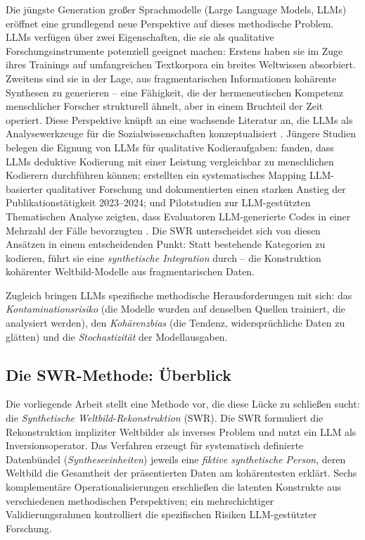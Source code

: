 \documentclass[11pt,a4paper]{article}
\theoremstyle{definition}
\theoremstyle{plain}
\theoremstyle{remark}
\begin{document}
Die j\"ungste Generation gro\ss{}er Sprachmodelle (Large Language Models, LLMs) er\"offnet eine grundlegend neue Perspektive auf dieses methodische Problem. LLMs verf\"ugen \"uber zwei Eigenschaften, die sie als qualitative Forschungsinstrumente potenziell geeignet machen: Erstens haben sie im Zuge ihres Trainings auf umfangreichen Textkorpora ein breites Weltwissen absorbiert. Zweitens sind sie in der Lage, aus fragmentarischen Informationen koh\"arente Synthesen zu generieren -- eine F\"ahigkeit, die der hermeneutischen Kompetenz menschlicher Forscher strukturell \"ahnelt, aber in einem Bruchteil der Zeit operiert. Diese Perspektive kn\"upft an eine wachsende Literatur an, die LLMs als Analysewerkzeuge f\"ur die Sozialwissenschaften konzeptualisiert \citep{Ziems2024, Bail2024, Argyle2023}. J\"ungere Studien belegen die Eignung von LLMs f\"ur qualitative Kodieraufgaben: \citet{Tai2024} fanden, dass LLMs deduktive Kodierung mit einer Leistung vergleichbar zu menschlichen Kodierern durchf\"uhren k\"onnen; \citet{Barros2024} erstellten ein systematisches Mapping LLM-basierter qualitativer Forschung und dokumentierten einen starken Anstieg der Publikationst\"atigkeit 2023--2024; und Pilotstudien zur LLM-gest\"utzten Thematischen Analyse zeigten, dass Evaluatoren LLM-generierte Codes in einer Mehrzahl der F\"alle bevorzugten \citep{Wang2025}. Die SWR unterscheidet sich von diesen Ans\"atzen in einem entscheidenden Punkt: Statt bestehende Kategorien zu kodieren, f\"uhrt sie eine \emph{synthetische Integration} durch -- die Konstruktion koh\"arenter Weltbild-Modelle aus fragmentarischen Daten.

Zugleich bringen LLMs spezifische methodische Herausforderungen mit sich: das \emph{Kontaminationsrisiko} (die Modelle wurden auf denselben Quellen trainiert, die analysiert werden), den \emph{Koh\"arenzbias} (die Tendenz, widerspr\"uchliche Daten zu gl\"atten) und die \emph{Stochastizit\"at} der Modellausgaben.

\subsection{Die SWR-Methode: \"Uberblick}
\label{sec:ueberblick}

Die vorliegende Arbeit stellt eine Methode vor, die diese L\"ucke zu schlie\ss{}en sucht: die \emph{Synthetische Weltbild-Rekonstruktion} (SWR). Die SWR formuliert die Rekonstruktion impliziter Weltbilder als inverses Problem und nutzt ein LLM als Inversionsoperator. Das Verfahren erzeugt f\"ur systematisch definierte Datenb\"undel (\emph{Syntheseeinheiten}) jeweils eine \emph{fiktive synthetische Person}, deren Weltbild die Gesamtheit der pr\"asentierten Daten am koh\"arentesten erkl\"art. Sechs komplement\"are Operationalisierungen erschlie\ss{}en die latenten Konstrukte aus verschiedenen methodischen Perspektiven; ein mehrschichtiger Validierungsrahmen kontrolliert die spezifischen Risiken LLM-gest\"utzter Forschung.
\end{document}
